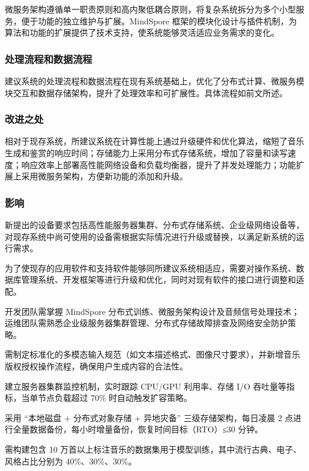 \documentclass{base}
\begin{document}
微服务架构遵循单一职责原则和高内聚低耦合原则，将复杂系统拆分为多个小型服务，便于功能的独立维护与扩展。MindSpore 框架的模块化设计与插件机制，为算法和功能的扩展提供了技术支持，使系统能够灵活适应业务需求的变化。

\subsubsection{处理流程和数据流程}

建议系统的处理流程和数据流程在现有系统基础上，优化了分布式计算、微服务模块交互和数据存储架构，提升了处理效率和可扩展性。具体流程如前文所述。

\subsubsection{改进之处}

相对于现存系统，所建议系统在计算性能上通过升级硬件和优化算法，缩短了音乐生成和鉴赏的响应时间；存储能力上采用分布式存储系统，增加了容量和读写速度；响应效率上部署高性能网络设备和负载均衡器，提升了并发处理能力；功能扩展上采用微服务架构，方便新功能的添加和升级。

\subsubsection{影响}

新提出的设备要求包括高性能服务器集群、分布式存储系统、企业级网络设备等，对现存系统中尚可使用的设备需根据实际情况进行升级或替换，以满足新系统的运行需求。

为了使现存的应用软件和支持软件能够同所建议系统相适应，需要对操作系统、数据库管理系统、开发框架等进行升级和优化，同时对现有软件的接口进行调整和适配。

开发团队需掌握 MindSpore 分布式训练、微服务架构设计及音频信号处理技术；运维团队需熟悉企业级服务器集群管理、分布式存储故障排查及网络安全防护策略。

需制定标准化的多模态输入规范（如文本描述格式、图像尺寸要求），并新增音乐版权授权操作流程，确保用户生成内容的合法性。

建立服务器集群监控机制，实时跟踪 CPU/GPU 利用率、存储 I/O 吞吐量等指标，当单节点负载超过 70\% 时自动触发扩容策略。  

采用 “本地磁盘 + 分布式对象存储 + 异地灾备” 三级存储架构，每日凌晨 2 点进行全量数据备份，每小时增量备份，恢复时间目标（RTO）≤30 分钟。

需构建包含 10 万首以上标注音乐的数据集用于模型训练，其中流行古典、电子、风格占比分别为 40\%、30\%、30\%。
\end{document}
